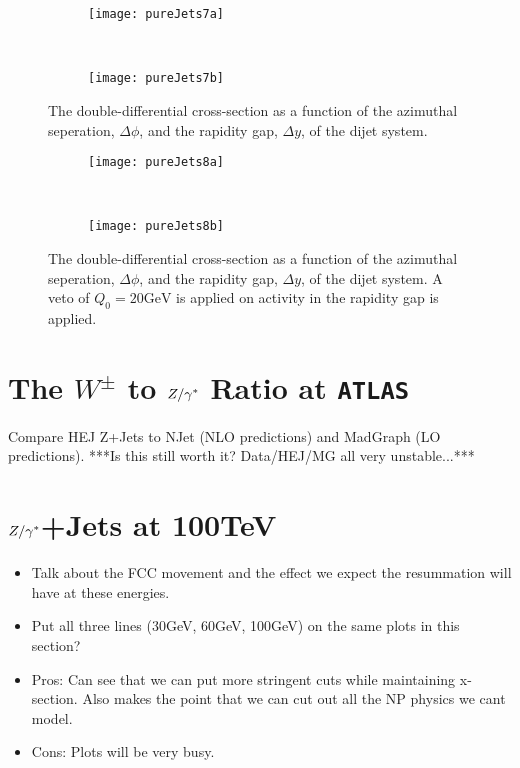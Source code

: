 	\begin{figure}[H]
		\centering
		\begin{subfigure}[b]{0.48\textwidth}
			\texttt{[image: pureJets7a]}
			\caption{}
			\label{fig:}
		\end{subfigure}
		~
		\begin{subfigure}[b]{0.48\textwidth}
			\texttt{[image: pureJets7b]}
			\caption{}
			\label{fig:}
		\end{subfigure}
		\caption{The double-differential cross-section as a function of the azimuthal seperation, $\Delta\phi$,
		         and the rapidity gap, $\Delta y$, of the dijet system.}
		\label{fig:}

		\begin{subfigure}[b]{0.48\textwidth}
			\texttt{[image: pureJets8a]}
			\caption{}
			\label{fig:}
		\end{subfigure}
		~
		\begin{subfigure}[b]{0.48\textwidth}
			\texttt{[image: pureJets8b]}
			\caption{}
			\label{fig:}
		\end{subfigure}
		\caption{The double-differential cross-section as a function of the azimuthal seperation, $\Delta\phi$,
		         and the rapidity gap, $\Delta y$, of the dijet system.  A veto of $Q_0=20\text{GeV}$ is applied
		         on activity in the rapidity gap is applied.}
		\label{fig:}
	\end{figure}

\chapter{The $W^\pm$ to $Z/\gamma^*$ Ratio at \texttt{ATLAS}}
\label{chap:WZRatio}

Compare HEJ Z+Jets to NJet (NLO predictions) and MadGraph (LO predictions).  ***Is this still worth it? Data/HEJ/MG all very unstable...***

\chapter{$Z/\gamma^*$+Jets at 100TeV}
\label{chap:100TeV}

	\begin{itemize}
		\item Talk about the FCC movement and the effect we expect the resummation will have at these energies.
		\item Put all three lines (30GeV, 60GeV, 100GeV) on the same plots in this section?
		\item Pros: Can see that we can put more stringent cuts while maintaining x-section.  Also
		      makes the point that we can cut out all the NP physics we cant model.
		\item Cons: Plots will be very busy.
	\end{itemize}

